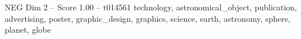\begin{textsample}{NEG Dim 2 – Score 1.00 – t014561}  \label{ex:f2_neg_030}
technology, astronomical\_object, publication, advertising, poster, graphic\_design, graphics, science, earth, astronomy, sphere, planet, globe

\end{textsample}
